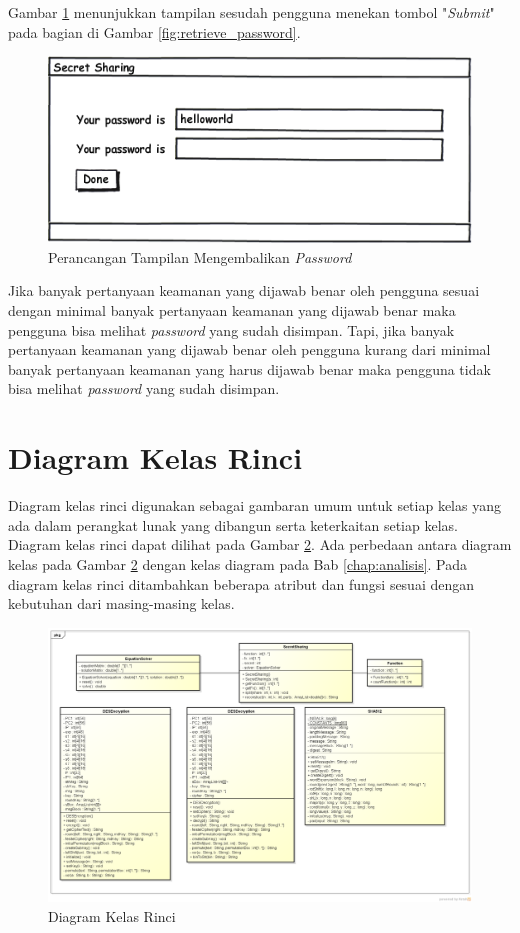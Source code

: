 Gambar \ref{fig:password} menunjukkan tampilan sesudah pengguna menekan tombol "\textit{Submit}" pada bagian di Gambar \ref{fig:retrieve_password}.

\begin{figure}[h]
	\centerline{\includegraphics[scale=0.5]{Gambar/password}}
	\caption{Perancangan Tampilan Mengembalikan \textit{Password}}\label{fig:password}
\end{figure}

Jika banyak pertanyaan keamanan yang dijawab benar oleh pengguna sesuai dengan minimal banyak pertanyaan keamanan yang dijawab benar maka pengguna bisa melihat \textit{password} yang sudah disimpan. Tapi, jika banyak pertanyaan keamanan yang dijawab benar oleh pengguna kurang dari minimal banyak pertanyaan keamanan yang harus dijawab benar maka pengguna tidak bisa melihat \textit{password} yang sudah disimpan.

\section{Diagram Kelas Rinci}

Diagram kelas rinci digunakan sebagai gambaran umum untuk setiap kelas yang ada dalam perangkat lunak yang dibangun serta keterkaitan setiap kelas. Diagram kelas rinci dapat dilihat pada Gambar \ref{fig:final_class_diagram}. Ada perbedaan antara diagram kelas pada Gambar \ref{fig:final_class_diagram} dengan kelas diagram pada Bab \ref{chap:analisis}. Pada diagram kelas rinci ditambahkan beberapa atribut dan fungsi sesuai dengan kebutuhan dari masing-masing kelas.

\begin{figure}
	\centerline{\includegraphics[scale=0.5]{Gambar/final_class_diagram}}
	\caption{Diagram Kelas Rinci}\label{fig:final_class_diagram}
\end{figure}

